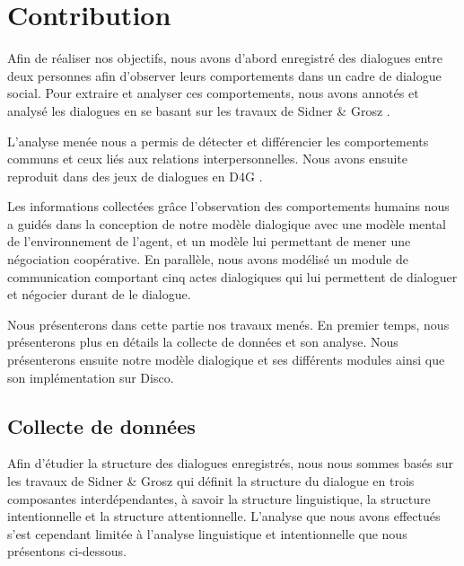 \documentclass[a4paper,french]{article}
\begin{document}
\section{Contribution}
\label{contribution}

\par Afin de réaliser nos objectifs, nous avons d'abord enregistré des dialogues entre deux personnes afin d'observer leurs comportements dans un cadre de dialogue social. 
Pour extraire et analyser ces comportements, nous avons annotés et analysé les dialogues  en se basant sur les travaux de Sidner \& Grosz \cite{grosz1986attention}. \par L'analyse menée nous a permis de détecter et différencier les comportements communs et ceux liés aux relations interpersonnelles. Nous avons ensuite reproduit dans des jeux de dialogues en D4G \cite{rich2009building}. 

\par Les informations collectées grâce l'observation des comportements humains nous a guidés dans la conception de notre modèle dialogique avec une modèle mental de l'environnement de l'agent, et un modèle lui permettant de mener une négociation coopérative. 
En parallèle, nous avons modélisé un module de communication comportant cinq actes dialogiques qui lui permettent de dialoguer et négocier durant de le dialogue. 
\par Nous présenterons dans cette partie nos travaux menés. En premier temps, nous présenterons plus en détails la collecte de données et son analyse. 
	Nous présenterons ensuite notre modèle dialogique et ses différents modules ainsi que son implémentation sur Disco. 
\subsection{Collecte de données}


Afin d'étudier la structure des dialogues enregistrés, nous nous sommes basés sur les travaux de Sidner \& Grosz \cite{grosz1986attention}  qui définit la structure du dialogue en trois composantes interdépendantes, à savoir la structure linguistique, la structure intentionnelle et la structure attentionnelle. L'analyse que nous avons effectués s'est cependant limitée à l'analyse linguistique et intentionnelle que nous présentons ci-dessous. 
\end{document}
